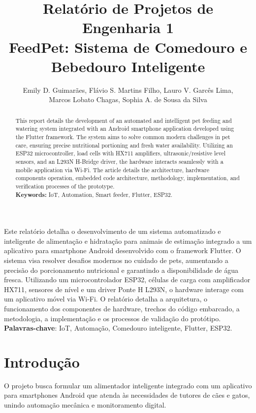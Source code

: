 \documentclass[12pt]{article}\usepackage{sbc-template}\usepackage{graphicx,url}\usepackage[utf8]{inputenc}
\title{Relatório de Projetos de Engenharia 1\\ FeedPet: Sistema de Comedouro e Bebedouro Inteligente}
\author{Emily D. Guimarães\inst{1}, Flávio S. Martins Filho\inst{1}, Lauro V. Garcês Lima\inst{1},\\
Marcos Lobato Chagas\inst{1}, Sophia A. de Sousa da Silva\inst{1}}
\begin{document}
 

\maketitle

\begin{abstract}
  This report details the development of an automated and intelligent pet feeding and watering system integrated with an Android smartphone application developed using the Flutter framework. The system aims to solve common modern challenges in pet care, ensuring precise nutritional portioning and fresh water availability. Utilizing an ESP32 microcontroller, load cells with HX711 amplifiers, ultrasonic/resistive level sensors, and an L293N H-Bridge driver, the hardware interacts seamlessly with a mobile application via Wi-Fi. The article details the architecture, hardware components operation, embedded code architecture, methodology, implementation, and verification processes of the prototype. \\
\textbf{Keywords:} IoT, Automation, Smart feeder, Flutter, ESP32.
\end{abstract}
     
\begin{resumo}
  Este relatório detalha o desenvolvimento de um sistema automatizado e inteligente de alimentação e hidratação para animais de estimação integrado a um aplicativo para smartphone Android desenvolvido com o framework Flutter. O sistema visa resolver desafios modernos no cuidado de pets, aumentando a precisão do porcionamento nutricional e garantindo a disponibilidade de água fresca. Utilizando um microcontrolador ESP32, células de carga com amplificador HX711, sensores de nível e um driver Ponte H L293N, o hardware interage com um aplicativo móvel via Wi-Fi. O relatório detalha a arquitetura, o funcionamento dos componentes de hardware, trechos do código embarcado, a metodologia, a implementação e os processos de validação do protótipo. \\
\textbf{Palavras-chave}: IoT, Automação, Comedouro inteligente, Flutter, ESP32.
\end{resumo}

\section{Introdução}

O projeto busca formular um alimentador inteligente integrado com um aplicativo para smartphones Android que atenda às necessidades de tutores de cães e gatos, unindo automação mecânica e monitoramento digital.
\end{document}
